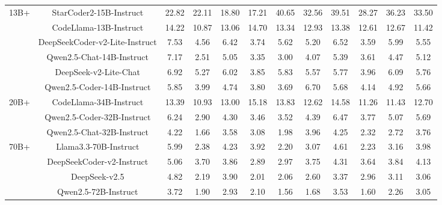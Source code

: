 \documentclass[11pt, a4paper, logo, copyright, nonumbering, amsart]{map}
\begin{document}
\begin{CJK*}{UTF8}{gbsn}
\begin{table*}[h!]
\begin{adjustbox}{width=\textwidth}
\begin{tabular}{c|c|cccccccccc}
    \midrule
    \multirow{6}{*}{13B+} 
    & StarCoder2-15B-Instruct & 22.82 & 22.11 & 18.80 & 17.21 & 40.65 & 32.56 & 39.51 & 28.27 & 36.23 & 33.50 \\
    & CodeLlama-13B-Instruct & 14.22 & 10.87 & 13.06 & 14.70 & 13.34 & 12.93 & 13.38 & 12.61 & 12.67 & 11.42 \\
    & DeepSeekCoder-v2-Lite-Instruct & 7.53 & 4.56 & 6.42 & 3.74 & 5.62 & 5.20 & 6.52 & 3.59 & 5.99 & 5.55 \\
    & Qwen2.5-Chat-14B-Instruct & 7.17 & 2.51 & 5.05 & 3.35 & 3.00 & 4.07 & 5.39 & 3.61 & 4.47 & 5.12 \\
    & DeepSeek-v2-Lite-Chat & 6.92 & 5.27 & 6.02 & 3.85 & 5.83 & 5.57 & 5.77 & 3.96 & 6.09 & 5.76 \\
    & Qwen2.5-Coder-14B-Instruct & 5.85 & 3.99 & 4.74 & 3.80 & 3.69 & 6.70 & 5.68 & 4.14 & 4.92 & 5.66 \\
    
    \midrule
    \multirow{3}{*}{20B+} 
    & CodeLlama-34B-Instruct & 13.39 & 10.93 & 13.00 & 15.18 & 13.83 & 12.62 & 14.58 & 11.26 & 11.43 & 12.70 \\
    & Qwen2.5-Coder-32B-Instruct & 6.24 & 2.90 & 4.30 & 3.46 & 3.52 & 4.39 & 6.47 & 3.77 & 5.07 & 5.69 \\
    & Qwen2.5-Chat-32B-Instruct & 4.22 & 1.66 & 3.58 & 3.08 & 1.98 & 3.96 & 4.25 & 2.32 & 2.72 & 3.76 \\
    
    \midrule
    \multirow{4}{*}{70B+} 
    & Llama3.3-70B-Instruct & 5.99 & 2.38 & 4.23 & 3.92 & 2.20 & 3.07 & 4.61 & 2.23 & 3.16 & 3.98 \\
    & DeepSeekCoder-v2-Instruct & 5.06 & 3.70 & 3.86 & 2.89 & 2.97 & 3.75 & 4.31 & 3.64 & 3.84 & 4.13 \\
    & DeepSeek-v2.5 & 4.82 & 2.19 & 3.90 & 2.01 & 2.06 & 2.60 & 3.37 & 2.96 & 3.11 & 3.06 \\
    & Qwen2.5-72B-Instruct & 3.72 & 1.90 & 2.93 & 2.10 & 1.56 & 1.68 & 3.53 & 1.60 & 2.26 & 3.05 \\
    

\end{tabular}
\end{adjustbox}
\end{table*}
\end{CJK*}
\end{document}
